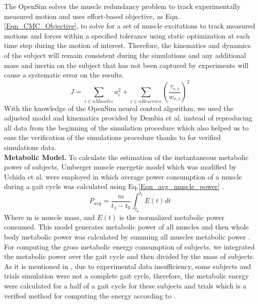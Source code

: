 \documentclass[10pt,letterpaper]{article}
\begin{document}
The OpenSim solves the muscle redundancy problem to track experimentally measured motion and uses effort-based objective, as Eqn. \ref{Eqn_CMC_Objective}, to solve for a set of muscle excitations to track measured motions and forces within a specified tolerance using static optimization at each time step during the motion of interest\cite{92}. Therefore, the kinematics and dynamics of the subject will remain consistent during the simulations and any additional mass and inertia on the subject that has not been captured by experiments will cause a systematic error on the results.\\
\begin{equation}\label{Eqn_CMC_Objective}
J = \sum_{i\in nMuscles} a_{i}^{2} + \sum_{i \in nReserves} (\frac{\tau_{r,i}}{w_{r,i}})^2
\end{equation}
With the knowledge of the OpenSim neural control algorithm, we used the adjusted model and kinematics provided by Dembia et al.\cite{93} instead of reproducing all data from the beginning of the simulation procedure which also helped us to ease the verification of the simulations procedure thanks to \cite{93} for verified simulations data.\\
\textbf{Metabolic Model.} To calculate the estimation of the instantaneous metabolic power of subjects, Umberger \cite{105} muscle energetic model which was modified by Uchida et al. \cite{106}  were employed in which average power consumption of a muscle during a gait cycle was calculated using Eq.\ref{Eqn_avg_muscle_power} \cite{106}.\\
\begin{equation}\label{Eqn_avg_muscle_power}
	P_{avg} = \frac{m}{t_1 - t_0}\int_{t_0}^{t_1} \dot{E(t)} dt
\end{equation}
Where m is muscle mass, and $\dot{E(t)}$ is the normalized metabolic power consumed. This model generates metabolic power of all muscles and then whole body metabolic power was calculated by summing all muscles metabolic power \cite{106}. For computing the gross metabolic energy consumption of subjects, we integrated the metabolic power over the gait cycle and then divided by the mass of subjects.\\
As it is mentioned in \cite{93}, due to experimental data insufficiency, some subjects and trials simulation were not a complete gait cycle, therefore, the metabolic energy were calculated for a half of a gait cycle for these subjects and trials which is a verified method for computing the energy according to \cite{93}. \\
\end{document}
